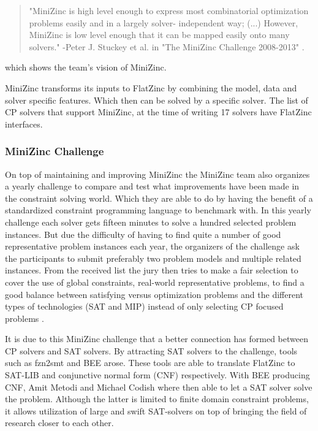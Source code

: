 \begin{quote}
	"MiniZinc is high level enough to express most combinatorial optimization problems easily and in a largely solver-
	independent way; (...) However, MiniZinc is low level enough that it can be mapped easily onto many solvers." 
	\newline
	-Peter J. Stuckey et al. in "The MiniZinc Challenge 2008-2013" \cite{58stuckey2014minizinc}.
\end{quote} which shows the team's vision of MiniZinc.

MiniZinc transforms its inputs to FlatZinc by combining the model, data and solver specific features. Which then can be solved by a specific solver. The list of CP solvers that support MiniZinc, at the time of writing 17 solvers have FlatZinc interfaces.

\subsubsection{MiniZinc Challenge}
On top of maintaining and improving MiniZinc the MiniZinc team also organizes a yearly challenge to compare and test what improvements have been made in the constraint solving world. Which they are able to do by having the benefit of a standardized constraint programming language to benchmark with. 
In this yearly challenge each solver gets fifteen minutes to solve a hundred selected problem instances. But due the difficulty of having to find quite a number of good representative problem instances each year, the organizers of the challenge ask the participants to submit preferably two problem models and multiple related instances. From the received list the jury then tries to make a fair selection to cover the use of global constraints, real-world representative problems, to find a good balance between satisfying versus optimization problems and the different types of technologies (SAT and MIP) instead of only selecting CP focused problems \cite{58stuckey2014minizinc}.

It is due to this MiniZinc challenge that a better connection has formed between CP solvers and SAT solvers. By attracting SAT solvers to the challenge, tools such as fzn2smt \cite{72bofill2010system} and BEE \cite{69BEEmetodi2012compiling} arose. These tools are able to translate FlatZinc to SAT-LIB and conjunctive normal form (CNF) respectively. 
With BEE producing CNF, Amit Metodi and Michael Codish where then able to let a SAT solver solve the problem. Although the latter is limited to finite domain constraint problems, it allows utilization of large and swift SAT-solvers on top of bringing the field of research closer to each other.

